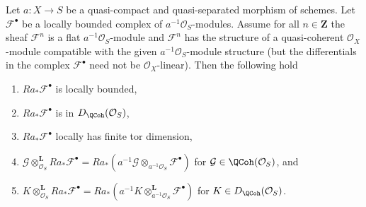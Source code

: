 \begin{lemma}
\label{lemma-cohomology-de-rham-base-change}
Let $a : X \to S$ be a quasi-compact and quasi-separated morphism
of schemes. Let $\mathcal{F}^\bullet$ be a locally bounded
complex of $a^{-1}\mathcal{O}_S$-modules. Assume for all $n \in \mathbf{Z}$
the sheaf $\mathcal{F}^n$ is a flat $a^{-1}\mathcal{O}_S$-module and
$\mathcal{F}^n$ has the structure of a quasi-coherent $\mathcal{O}_X$-module
compatible with the given $a^{-1}\mathcal{O}_S$-module structure (but the
differentials in the complex $\mathcal{F}^\bullet$ need not
be $\mathcal{O}_X$-linear). Then the following hold
\begin{enumerate}
\item $Ra_*\mathcal{F}^\bullet$ is locally bounded,
\item $Ra_*\mathcal{F}^\bullet$ is in $D_\QCoh(\mathcal{O}_S)$,
\item $Ra_*\mathcal{F}^\bullet$ locally has finite tor dimension,
\item $\mathcal{G} \otimes_{\mathcal{O}_S}^\mathbf{L} Ra_*\mathcal{F}^\bullet =
Ra_*(a^{-1}\mathcal{G} \otimes_{a^{-1}\mathcal{O}_S} \mathcal{F}^\bullet)$
for $\mathcal{G} \in \QCoh(\mathcal{O}_S)$, and
\item $K \otimes_{\mathcal{O}_S}^\mathbf{L} Ra_*\mathcal{F}^\bullet =
Ra_*(a^{-1}K \otimes_{a^{-1}\mathcal{O}_S}^\mathbf{L} \mathcal{F}^\bullet)$
for $K \in D_\QCoh(\mathcal{O}_S)$.
\end{enumerate}
\end{lemma}

